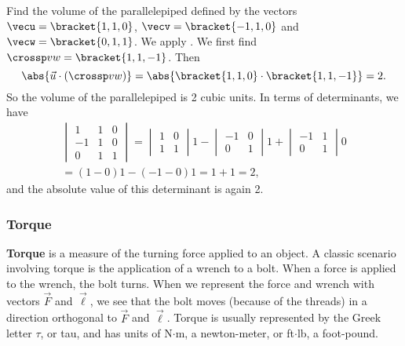\begin{example}\label{ex_crossp6}
Find the volume of the parallelepiped defined by the vectors $\vecu = \bracket{1,1,0}$, $\vecv = \bracket{-1,1,0}$ and $\vecw = \bracket{0,1,1}$.
\solution
We apply . We first find $\crossp vw =\bracket{1,1,-1}$. Then
\[\abs{\vec u\cdot(\crossp vw)} = \abs{\bracket{1,1,0}\cdot \bracket{1,1,-1}} = 2.\]
So the volume of the parallelepiped is 2 cubic units.  In terms of determinants, we have
\begin{multline*}
 \begin{vmatrix}1&1&0\\ -1&1&0\\0&1&1\end{vmatrix}
 =\begin{vmatrix}1&0\\1&1\end{vmatrix}1
 -\begin{vmatrix}-1&0\\0&1\end{vmatrix}1
 +\begin{vmatrix}-1&1\\0&1\end{vmatrix}0\\
 =(1-0)1-(-1-0)1
 =1+1
 =2,
\end{multline*}
and the absolute value of this determinant is again 2.
\end{example}


\subsubsection{Torque}

\textbf{Torque} is a measure of the turning force applied to an object. A classic scenario involving torque is the application of a wrench to a bolt. When a force is applied to the wrench, the bolt turns. When we represent the force and wrench with vectors $\vec F$ and $\vec \ell$, we see that the bolt moves (because of the threads) in a  direction orthogonal to $\vec F$ and $\vec \ell$. Torque is usually represented by the Greek letter $\tau$, or tau, and has units of N$\cdot$m, a newton-meter, or ft$\cdot$lb, a foot-pound.

